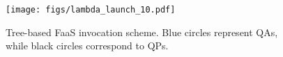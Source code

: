\begin{figure}[h]%
\centering  
\texttt{[image: figs/lambda\_launch\_10.pdf]}
\caption{Tree-based FaaS invocation scheme. Blue circles represent QAs, while black circles correspond to QPs.}
\label{fig:squash-lambda-invocation}
\end{figure}